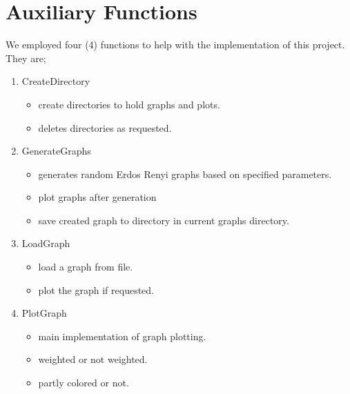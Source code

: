 \documentclass[longpaper, english, final, times]{revdetua}
\begin{document}
	\section{Auxiliary Functions}
		We employed four (4) functions to help with the implementation of this project. They are;
		\begin{enumerate}[label=\arabic*)]
			\item CreateDirectory
				\begin{itemize}
					\item create directories to hold graphs and plots.
					\item deletes directories as requested.
				\end{itemize}
			\item GenerateGraphs
				\begin{itemize}
					\item generates random Erdos Renyi graphs based on specified parameters. 
					\item plot graphs after generation
					\item save created graph to directory in current graphs directory.
				\end{itemize}
			\item LoadGraph
				\begin{itemize}
					\item load a graph from file.
					\item plot the graph if requested.
				\end{itemize}
			\item PlotGraph
				\begin{itemize}
					\item main implementation of graph plotting.
					\item weighted or not weighted.
					\item partly colored or not.
				\end{itemize}
		\end{enumerate}
		
		
	
\end{document}
